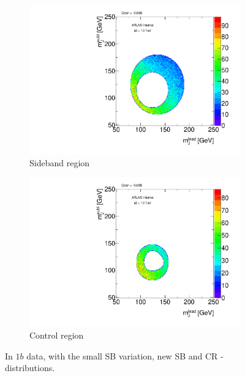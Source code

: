 \begin{figure}[htbp!]
\centering
\captionsetup{justification=centering}
    \begin{subfigure}[b]{0.39\textwidth}
        \includegraphics[width=\textwidth,angle=-90]{figures/boosted/Syst_CRSB/SB_Small_Sideband_OneTag_mH0H1.pdf}
        \caption{Sideband region}
        \label{CRSB:SB_Small_SB}
    \end{subfigure}
    \quad
    \begin{subfigure}[b]{0.39\textwidth}
        \includegraphics[width=\textwidth,angle=-90]{figures/boosted/Syst_CRSB/SB_Small_Control_OneTag_mH0H1.pdf}
        \caption{Control region}
        \label{CRSB:SB_Small_CR}
    \end{subfigure}
\caption{In $1b$ data, with the small SB variation, new SB and CR \mleadJ-\msublJ~ distributions.}
\label{CRSB:SB_Small}
\end{figure}

